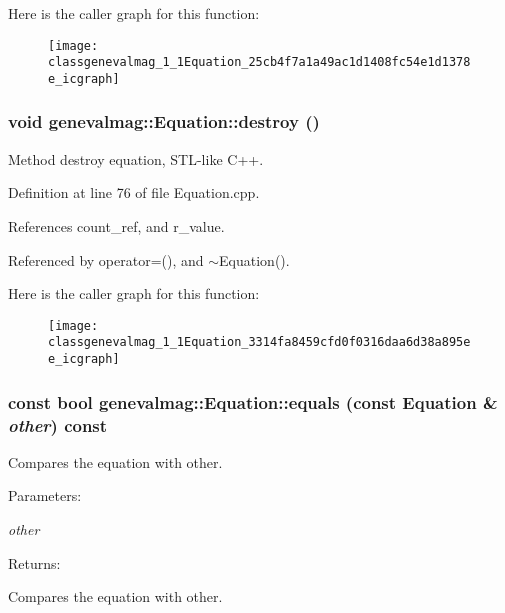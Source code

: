 Here is the caller graph for this function:\nopagebreak
\begin{figure}[H]
\begin{center}
\leavevmode
\texttt{[image: classgenevalmag\_1\_1Equation\_25cb4f7a1a49ac1d1408fc54e1d1378e\_icgraph]}
\end{center}
\end{figure}
\hypertarget{classgenevalmag_1_1Equation_3314fa8459cfd0f0316daa6d38a895ee}{
\subsubsection[{destroy}]{\setlength{\rightskip}{0pt plus 5cm}void genevalmag::Equation::destroy ()}}
\label{classgenevalmag_1_1Equation_3314fa8459cfd0f0316daa6d38a895ee}


Method destroy equation, STL-like C++. 

Definition at line 76 of file Equation.cpp.

References count\_\-ref, and r\_\-value.

Referenced by operator=(), and $\sim$Equation().

Here is the caller graph for this function:\nopagebreak
\begin{figure}[H]
\begin{center}
\leavevmode
\texttt{[image: classgenevalmag\_1\_1Equation\_3314fa8459cfd0f0316daa6d38a895ee\_icgraph]}
\end{center}
\end{figure}
\hypertarget{classgenevalmag_1_1Equation_ea30f41bb039e1665cdf1a2075435010}{
\subsubsection[{equals}]{\setlength{\rightskip}{0pt plus 5cm}const bool genevalmag::Equation::equals (const {\bf Equation} \& {\em other}) const}}
\label{classgenevalmag_1_1Equation_ea30f41bb039e1665cdf1a2075435010}


Compares the equation with other. \begin{Desc}
\item[Parameters:]
\begin{description}
\item[{\em other}]\end{description}
\end{Desc}
\begin{Desc}
\item[Returns:]\end{Desc}
Compares the equation with other. 

